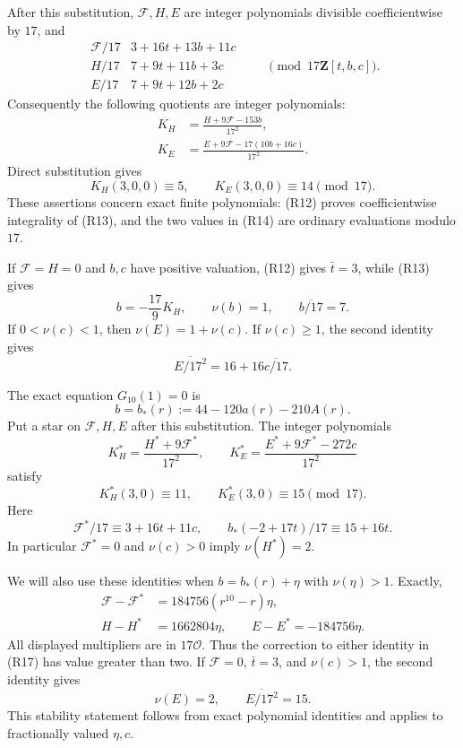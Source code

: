\documentclass[
  british,
  10pt,
  a4paper,
]{article}
\begin{document}
After this substitution, \(\mathcal F,H,E\) are integer polynomials
divisible coefficientwise by \(17\), and \[
\begin{array}{c|l}
\mathcal F/17&3+16t+13b+11c\\
H/17&7+9t+11b+3c\\
E/17&7+9t+12b+2c
\end{array}
\qquad\pmod {17\mathbf Z[t,b,c]}.                            \tag{R12}
\] Consequently the following quotients are integer polynomials: \[
\begin{aligned}
K_H&=\frac{H+9\mathcal F-153b}{17^2},\\
K_E&=\frac{E+9\mathcal F-17(10b+16c)}{17^2}.
\end{aligned}                                                \tag{R13}
\] Direct substitution gives \[
K_H(3,0,0)\equiv5,\qquad K_E(3,0,0)\equiv14\pmod {17}.         \tag{R14}
\] These assertions concern exact finite polynomials: (R12) proves
coefficientwise integrality of (R13), and the two values in (R14) are
ordinary evaluations modulo \(17\).

If \(\mathcal F=H=0\) and \(b,c\) have positive valuation, (R12) gives
\(\bar t=3\), while (R13) gives \[
b=-\frac{17}{9}K_H,\qquad
\nu(b)=1,\qquad \overline{b/17}=7.                            \tag{R15}
\] If \(0<\nu(c)<1\), then \(\nu(E)=1+\nu(c)\). If \(\nu(c)\geq1\), the
second identity gives \[
\overline{E/17^2}=16+16\overline{c/17}.                        \tag{R16}
\]

The exact equation \(G_{10}(1)=0\) is \[
b=b_*(r):=44-120a(r)-210A(r).
\] Put a star on \(\mathcal F,H,E\) after this substitution. The integer
polynomials \[
K_H^*=\frac{H^*+9\mathcal F^*}{17^2},\qquad
K_E^*=\frac{E^*+9\mathcal F^*-272c}{17^2}                      \tag{R17}
\] satisfy \[
K_H^*(3,0)\equiv11,\qquad K_E^*(3,0)\equiv15\pmod {17}.        \tag{R18}
\] Here \[
\mathcal F^*/17\equiv3+16t+11c,\qquad
b_*(-2+17t)/17\equiv15+16t.
\] In particular \(\mathcal F^*=0\) and \(\nu(c)>0\) imply
\(\nu(H^*)=2\).

We will also use these identities when \(b=b_*(r)+\eta\) with
\(\nu(\eta)>1\). Exactly, \[
\begin{aligned}
\mathcal F-\mathcal F^*&=184756(r^{10}-r)\eta,\\
H-H^*&=1662804\eta,\qquad E-E^*=-184756\eta.
\end{aligned}                                                \tag{R19}
\] All displayed multipliers are in \(17\mathcal O\). Thus the
correction to either identity in (R17) has value greater than two. If
\(\mathcal F=0\), \(\bar t=3\), and \(\nu(c)>1\), the second identity
gives \[
\nu(E)=2,\qquad \overline{E/17^2}=15.                         \tag{R20}
\] This stability statement follows from exact polynomial identities and
applies to fractionally valued \(\eta,c\).
\end{document}
